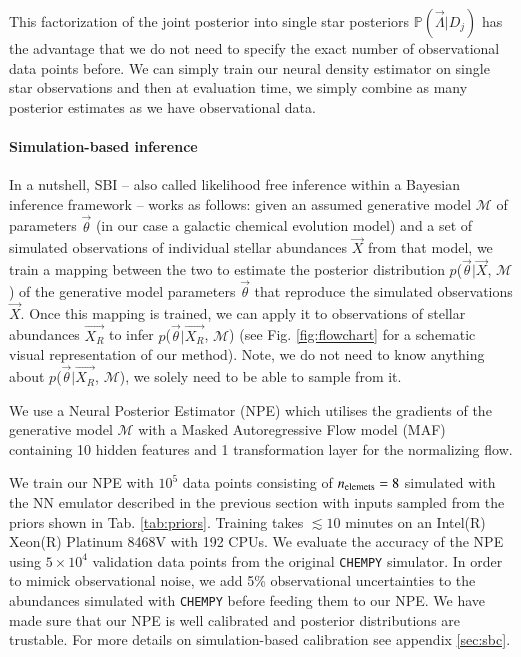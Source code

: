 \documentclass{aa}
\begin{document}
This factorization of the joint posterior into single star posteriors $\mathbb{P}(\vec\Lambda|D_j)$ has the advantage that we do not need to specify the exact number of observational data points before. We can simply train our neural density estimator on single star observations and then at evaluation time, we simply combine as many posterior estimates as we have observational data.


\paragraph{Simulation-based inference}
In a nutshell, SBI \citep[e.g.][]{Cranmer2020,Papamakarios:2021,Gloeckler2024AllinoneSI} -- also called likelihood free inference within a Bayesian inference framework -- works as follows: given an assumed generative model $\mathcal{M}$ of parameters $\Vec{\theta}$ (in our case a galactic chemical evolution model) and a set of simulated observations of individual stellar abundances $\Vec{X}$ from that model, we train a mapping between the two to estimate the posterior distribution $p$($\Vec{\theta}|\Vec{X}$, $\mathcal{M}$) of the generative model parameters $\Vec{\theta}$ that reproduce the simulated observations $\Vec{X}$. Once this mapping is trained, we can apply it to observations of stellar abundances $\Vec{X_R}$ to infer $p$($\Vec{\theta}|\Vec{X_R}$, $\mathcal{M}$) (see Fig. \ref{fig:flowchart} for a schematic visual representation of our method). Note, we do not need to know anything about $p$($\Vec{\theta}|\Vec{X_R}$, $\mathcal{M}$), we solely need to be able to sample from it.

We use a Neural Posterior Estimator (NPE) \cite{zeghal2022neuralposteriorestimationdifferentiable} which utilises the gradients of the generative model $\mathcal{M}$ with a Masked Autoregressive Flow model (MAF) \cite{papamakarios2018maskedautoregressiveflowdensity} containing 10 hidden features and 1 transformation layer for the normalizing flow.

We train our NPE with $10^5$ data points consisting of $n_{\rm elemets}=8$ simulated with the NN emulator described in the previous section with inputs sampled from the priors shown in Tab. \ref{tab:priors}. Training takes $\lesssim10$ minutes on an Intel(R) Xeon(R) Platinum 8468V with 192 CPUs. 
We evaluate the accuracy of the NPE using $5\times10^4$ validation data points from the original \texttt{CHEMPY} simulator. In order to mimick observational noise, we add 5\% observational uncertainties to the abundances simulated with \texttt{CHEMPY} before feeding them to our NPE.
We have made sure that our NPE is well calibrated and posterior distributions are trustable. For more details on simulation-based calibration see appendix \ref{sec:sbc}.
\end{document}
